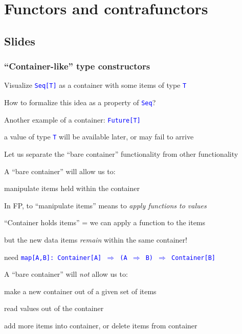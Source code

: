 
\chapter{Functors and contrafunctors}

\section{Slides}

\subsection{``Container-like'' type constructors}

Visualize \texttt{\textcolor{blue}{\footnotesize{}Seq{[}T{]}}} as
a container with some items of type \texttt{\textcolor{blue}{\footnotesize{}T}}{\footnotesize\par}

How to formalize this idea as a property of \texttt{\textcolor{blue}{\footnotesize{}Seq}}?

Another example of a container: \texttt{\textcolor{blue}{\footnotesize{}Future{[}T{]}}}{\footnotesize\par}

a value of type \texttt{\textcolor{blue}{\footnotesize{}T}} will be
available later, or may fail to arrive

Let us separate the ``bare container'' functionality from other
functionality

A ``bare container'' will allow us to:

manipulate items held within the container

In FP, to ``manipulate items'' means to \emph{apply functions to
values}

``Container holds items'' = we can apply a function to the items

but the new data items \emph{remain} within the same container!

need \texttt{\textcolor{blue}{\footnotesize{}map{[}A,B{]}:\ Container{[}A{]}
$\Rightarrow$ (A $\Rightarrow$ B) $\Rightarrow$ Container{[}B{]}}}{\footnotesize\par}

A ``bare container'' will \emph{not} allow us to:

make a new container out of a given set of items

read values out of the container

add more items into container, or delete items from container

